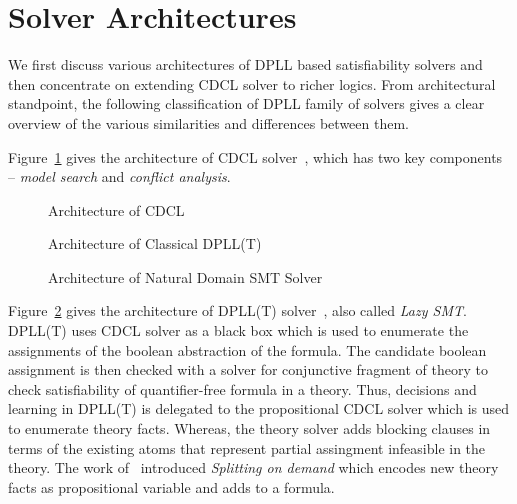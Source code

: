 \section{Solver Architectures}
%
We first discuss various architectures of DPLL based satisfiability solvers and then 
concentrate on extending CDCL solver to richer logics.  From architectural standpoint, 
the following classification of DPLL family of solvers gives a clear overview 
of the various similarities and differences between them.  

Figure~\ref{cdcl} gives the architecture of CDCL solver~\cite{cdcl}, which 
has two key components -- \emph{model search} and \emph{conflict analysis}.  
%
\begin{figure}
\centering
{}
  \caption{Architecture of CDCL \label{cdcl}}
\end{figure} 
%
%
\begin{figure}
\centering
{}
  \caption{Architecture of Classical DPLL(T) \label{dpll}}
\end{figure} 
%
\begin{figure}
\centering
{}
  \caption{Architecture of Natural Domain SMT Solver \label{natural-domain-smt}}
\end{figure} 
%
\begin{figure}
\centering
{}
  \caption{ \label{mcsat}}
\end{figure} 
%
Figure~\ref{dpll} gives the architecture of DPLL(T) solver~\cite{cdcl,smt1,smt2}, also 
called \emph{Lazy SMT}.  
DPLL(T) uses CDCL solver as a black box which is used to enumerate the 
assignments of the boolean abstraction of the formula. The candidate boolean 
assignment is then checked with a solver for conjunctive fragment of theory to 
check satisfiability of quantifier-free formula in a theory.  Thus, decisions and 
learning in DPLL(T) is delegated to the propositional CDCL solver which is used to 
enumerate theory facts.  Whereas, the theory solver adds blocking clauses in terms of 
the existing atoms that represent partial assingment infeasible in the theory.   The 
work of~\cite{} introduced \emph{Splitting on demand} 
which encodes new theory facts as propositional variable and adds to a formula.  

